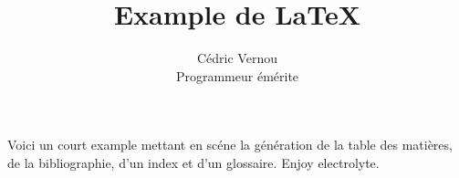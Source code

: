 \documentclass[11pt]{article}
\begin{document}
\title{Example de LaTeX}
\author{Cédric Vernou\\
Programmeur émérite}

\maketitle
\tableofcontents
\newpage

Voici un court example mettant en scéne la génération de la table des matières, de la bibliographie, d'un index et d'un glossaire\cite{ARTMCCDDS}.
Enjoy \gls{electrolyte}.





\printglossaries



\end{document}
